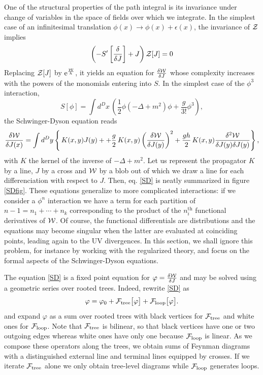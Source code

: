 \documentclass[12pt,here,feynmf]{article}
\begin{document}
One of the structural properties of the path integral is its invariance under change of variables in the space of fields over which we integrate. In the simplest case of an infinitesimal translation $\phi(x)\rightarrow\phi(x)+\epsilon(x)$, the invariance of ${\cal Z}$ implies
\begin{equation}
\left(-S'\left[\frac{\delta}{\delta J}\right]+J\right){\cal Z}[J]=0
\end{equation} 
Replacing ${\cal Z}[J]$ by $\mathrm{e}^{\frac{{\cal W}}{h}}$, it yields an equation for $\frac{\delta{\cal W}}{\delta J}$ whose complexity increases with the powers of the monomials entering into $S$.
In the simplest case of the $\phi^{3}$ interaction,
\begin{equation}
S[\phi]=\int{d^{D}x}\,\left(\frac{1}{2}\phi\left(-\Delta+m^{2}\right)\phi+\frac{g}{3!}\phi^{3}\right),
\end{equation}
the Schwinger-Dyson equation reads
\begin{equation}
\frac{\delta{\cal W}}{\delta J(x)}=\int d^{D}y\left\{\,K(x,y)J(y)+
+\frac{g}{2}\,K(x,y)\left(\frac{\delta {\cal W}}{\delta J(y)}\right)^{2}
+\frac{gh}{2}\,K(x,y)\frac{\delta^{2}{\cal W}}{\delta J(y)\delta J(y)}\right\},\label{SD}
\end{equation}
with $K$ the kernel of the inverse of $-\Delta+m^{2}$. Let us represent the propagator  $K$ by a line, $J$ by a cross and ${\cal W}$ by a blob out of which we draw a line for each differenciation with respect to $J$. Then, eq. \eqref{SD} is neatly summarized in figure \ref{SDfig}. These equations generalize to more complicated interactions: if we consider a $\phi^{n}$ interaction we have a term for each partition of $n-1=n_{1}+\cdots+n_{k}$ corresponding to the product of the $n_{i}^{\mathrm{th}}$ functional derivatives of ${\cal W}$. Of course, the functional differentials are distributions and the equations may become singular when the latter are evaluated at coinciding points, leading again to the UV divergences. In this section, we shall ignore this problem, for instance by working with the regularized theory, and focus on the formal aspects of the Schwinger-Dyson equations. 
  
The equation \eqref{SD} is a fixed point equation for $\varphi=\frac{\delta {\cal W}}{\delta J}$ and may be solved using a geometric series over rooted  trees. Indeed, rewrite  \eqref{SD} as
\begin{equation}
\varphi=\varphi_{0}+{\cal F}_{\mathrm{tree}}\big[\varphi\big]+{\cal F}_{\mathrm{loop}}\big[\varphi\big].
\end{equation}
and expand $\varphi$ as a sum over rooted trees with black vertices for ${\cal F}_{\mathrm{tree}}$ and white ones for ${\cal F}_{\mathrm{loop}}$. Note that ${\cal F}_{\mathrm{tree}}$ is bilinear, so that black vertices have one or two outgoing edges whereas white ones have only one because ${\cal F}_{\mathrm{loop}}$ is linear. As we compose these operators along the trees, we obtain sums of Feynman diagrams with a distinguished external line and terminal lines equipped by crosses. If we iterate ${\cal F}_{\mathrm{tree}}$ alone we only obtain tree-level diagrams while ${\cal F}_{\mathrm{loop}}$ generates loops.   
\end{document}
